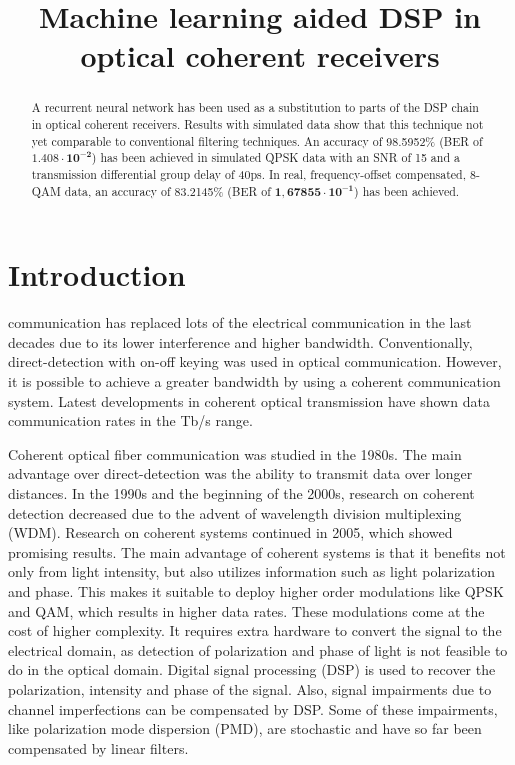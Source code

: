 \documentclass[journal,10pt,twoside, a4paper]{IEEEtran}
\title{Machine learning aided DSP in optical coherent receivers}
\author{
    \IEEEauthorblockN{L.H.P. Driessen\\}
    \IEEEauthorblockA{l.h.p.driessen@student.tue.nl, ID 0962549}
}
\begin{document}
\maketitle

\begin{abstract}
    A recurrent neural network has been used as a substitution to parts of the DSP chain in optical coherent receivers. Results with simulated data show that this technique not yet comparable to conventional filtering techniques. An accuracy of 98.5952\% (BER of $\mathbf{1.408\cdot 10^{-2}}$) has been achieved in simulated QPSK data with an SNR of 15 and a transmission differential group delay of 40ps. In real, frequency-offset compensated, 8-QAM data, an accuracy of 83.2145\% (BER of $\mathbf{1,67855\cdot 10^{-1}}$) has been achieved.
\end{abstract}

\section{Introduction}
 communication has replaced lots of the electrical communication in the last decades due to its lower interference and higher bandwidth. Conventionally, direct-detection with on-off keying was used in optical communication. However, it is possible to achieve a greater bandwidth by using a coherent communication system\cite{coherent_detection,DSP_beyond}. Latest developments in coherent optical transmission have shown data communication rates in the Tb/s range\cite{coherent_detection, DSP_beyond, dsp+ml}.

Coherent optical fiber communication was studied in the 1980s. The main advantage over direct-detection was the ability to transmit data over longer distances\cite{coherent_detection}. In the 1990s and the beginning of the 2000s, research on coherent detection decreased due to the advent of wavelength division multiplexing (WDM). Research on coherent systems continued in 2005, which showed promising results\cite{continue}. The main advantage of coherent systems is that it benefits not only from light intensity, but also utilizes information such as light polarization and phase. This makes it suitable to deploy higher order modulations like QPSK and QAM, which results in higher data rates. These modulations come at the cost of higher complexity. It requires extra hardware to convert the signal to the electrical domain, as detection of polarization and phase of light is not feasible to do in the optical domain\cite{coherent_detection}. Digital signal processing (DSP) is used to recover the polarization, intensity and phase of the signal. Also, signal impairments due to channel imperfections can be compensated by DSP\cite{coherent_detection, DSP_2, DSP_beyond}. Some of these impairments, like polarization mode dispersion (PMD), are stochastic\cite{nonlinear} and have so far been compensated by linear filters.
\end{document}
